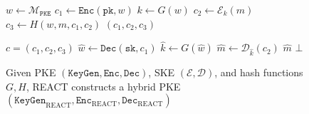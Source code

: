\documentclass[runningheads]{llncs}
\newcommand{\pke}{\texttt{PKE}}
\newcommand{\keygen}{\texttt{KeyGen}}
\newcommand{\encrypt}{\texttt{Enc}}
\newcommand{\decrypt}{\texttt{Dec}}
\newcommand{\pk}{\texttt{pk}}
\newcommand{\sk}{\texttt{sk}}
\begin{document}
\begin{figure}[h]
    \centering
    \begin{minipage}[t]{0.45\textwidth}
        \begin{algorithm}[H]
            \caption*{$\encrypt_\text{REACT}(\pk, m)$}
            \begin{algorithmic}[1]
                \State $w \leftarrow \mathcal{M}_\pke$
                \State $c_1 \leftarrow \encrypt(\pk, w)$
                \State $k \leftarrow G(w)$
                \State $c_2 \leftarrow \mathcal{E}_k(m)$
                \State $c_3 \leftarrow H(w, m, c_1, c_2)$
                \State \Return $(c_1, c_2, c_3)$
            \end{algorithmic}
        \end{algorithm}
    \end{minipage}\hfill
    \begin{minipage}[t]{0.45\textwidth}
        \begin{algorithm}[H]
            \caption*{$\decrypt_\text{REACT}(\sk, c)$}
            \begin{algorithmic}[1]
                \Require $c = (c_1, c_2, c_3)$
                \State $\hat{w} \leftarrow \decrypt(\sk, c_1)$
                \State $\hat{k} \leftarrow G(\hat{w})$
                \State $\hat{m} \leftarrow \mathcal{D}_{\hat{k}}(c_2)$
                    \State \Return $\hat{m}$
                \Else
                    \State \Return $\bot$
                \EndIf
            \end{algorithmic}
        \end{algorithm}
    \end{minipage}
    \caption{Given PKE $(\keygen, \encrypt, \decrypt)$, SKE $(\mathcal{E}, \mathcal{D})$, and hash functions $G, H$, REACT constructs a hybrid PKE $(\keygen_\text{REACT}, \encrypt_\text{REACT}, \decrypt_\text{REACT})$}\label{fig:react}
\end{figure}
\end{document}
